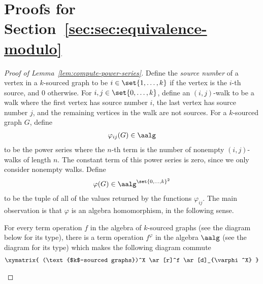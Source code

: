 \section{Proofs for Section~\ref{sec:sec:equivalence-modulo}}

\begin{proof}[Proof of Lemma~\ref{lem:compute-power-series}]

    
    
        
        Define the \emph{source number} of a vertex in a $k$-sourced graph to be  $i \in \set{1,\ldots,k}$ if the vertex is the $i$-th source, and $0$ otherwise. For
        $i,j \in \set{0,\ldots,k}$,
        define an  $(i,j)$-walk to be a walk where the first vertex has source number $i$, the last vertex has source number $j$, and the remaining vertices in the walk are not sources. For a $k$-sourced graph $G$, define 
        \begin{align*}
        \varphi_{ij}(G) \in \aalg
        \end{align*}
         to be the power series where the $n$-th term is the number of nonempty $(i,j)$-walks of length $n$. The constant term  of this power series is zero, since we only consider nonempty walks. Define 
        \begin{align*}
        \varphi(G) \in \aalg^{\set{0,\ldots,k}^2}
        \end{align*}
        to be the tuple of all of the values returned by the functions $\varphi_{ij}$. 
        The main observation is that $\varphi$ is an algebra homomorphism, in the following sense.
        \begin{claim}
            For every term operation $f$ 
            in the algebra of $k$-sourced graphs (see the diagram below for its type), there is a term operation $f^\varphi$ in the algebra $\aalg$ (see the diagram for its type) which makes the following diagram commute
            \begin{align*}
            \xymatrix{
                (\text{$k$-sourced graphs})^X 
                \ar[r]^f
                \ar[d]_{\varphi^X}
}
\end{align*}
\end{claim}
\end{proof}
